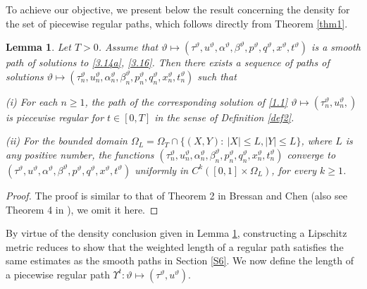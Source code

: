 \documentclass[11pt,reqno]{article}
\newtheorem{lem}{Lemma}
\numberwithin{equation}{section}
\begin{document}
To achieve our objective, we present below the result concerning the density for the set of piecewise regular paths, which follows directly from Theorem \ref{thm1}.
\begin{lem}\label{lem7}
Let $T>0$. Assume that $\vartheta\mapsto(\tau^\vartheta, u^\vartheta, \alpha^\vartheta, \beta^\vartheta, p^\vartheta, q^\vartheta, x^\vartheta, t^\vartheta)$ is a smooth path of solutions to \eqref{3.14a}, \eqref{3.16}. Then there exists a sequence of paths of solutions $\vartheta\mapsto(\tau_{n}^\vartheta, u_{n}^\vartheta, \alpha_{n}^\vartheta, \beta_{n}^\vartheta, p_{n}^\vartheta, q_{n}^\vartheta, x_{n}^\vartheta, t_{n}^\vartheta)$ such that

{\rm (i)} For each $n\geq1$, the path of the corresponding solution of \eqref{1.1} $\vartheta\mapsto (\tau_{n}^\vartheta, u_{n}^\vartheta, )$ is piecewise regular for $t\in[0,T]$ in the sense of Definition \ref{def2}.

{\rm (ii)} For the bounded domain $\Omega_L=\Omega_T\cap \{(X,Y):\ |X|\leq L, |Y|\leq L\}$, where $L$ is any positive number, the functions $(\tau_{n}^\vartheta, u_{n}^\vartheta, \alpha_{n}^\vartheta, \beta_{n}^\vartheta, p_{n}^\vartheta, q_{n}^\vartheta, x_{n}^\vartheta, t_{n}^\vartheta)$ converge to $(\tau^\vartheta, u^\vartheta, \alpha^\vartheta, \beta^\vartheta, p^\vartheta, q^\vartheta, x^\vartheta, t^\vartheta)$ uniformly in $C^k([0,1]\times\Omega_L)$, for every $k\geq1$.
\end{lem}
\begin{proof}
The proof is similar to that of Theorem 2 in Bressan and Chen \cite{BC1} (also see Theorem 4 in \cite{BC2}), we omit it here.
\end{proof}

By virtue of the density conclusion given in Lemma \ref{lem7}, constructing a Lipschitz metric reduces to show that the weighted length of a regular path satisfies the same estimates as the smooth paths in Section \ref{S6}. We now define the length of a piecewise regular path $\Upsilon^t: \vartheta\mapsto (\tau^\vartheta, u^\vartheta)$.
\end{document}
